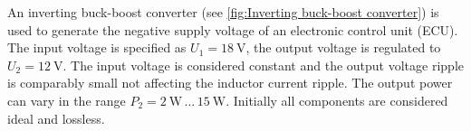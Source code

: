 

An inverting buck-boost converter (see \autoref{fig:Inverting buck-boost converter}) is used to generate the negative supply voltage of an electronic control unit (ECU). The input voltage is specified as $U_\mathrm{1}=\SI{18}{\volt}$, the output voltage is regulated to $U_\mathrm{2}=\SI{12}{\volt}$. The input voltage is considered constant and the output voltage ripple is comparably small not affecting the inductor current ripple. The output power can vary in the range $P_\mathrm{2} = \SI{2}{\watt} \, \dots \, \SI{15}{\watt}$. Initially all components are considered ideal and lossless.




